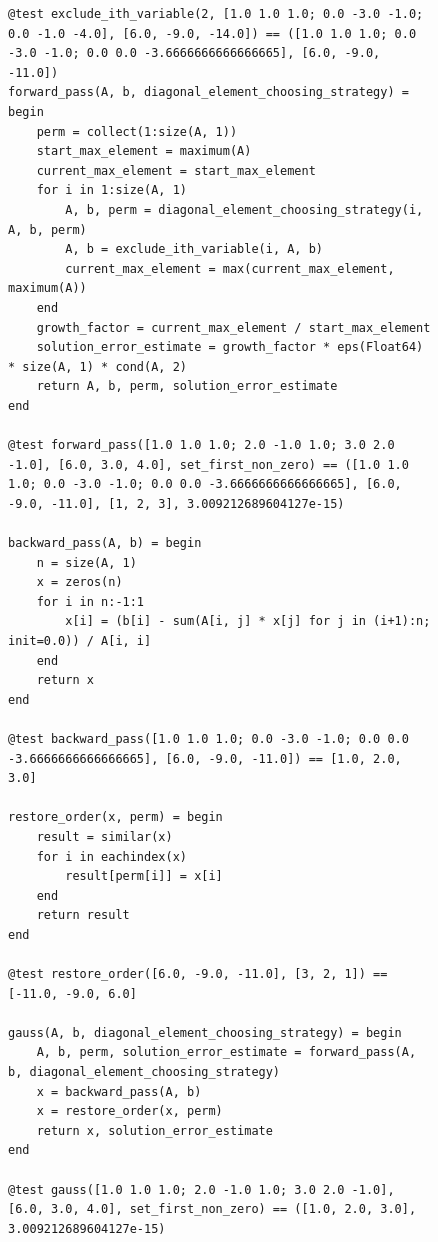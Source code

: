 \documentclass[a4paper, 14pt]{extarticle}
\begin{document}

\begin{figure}[!htb]
\begin{lstlisting}[language={},caption={Метод Гаусса (продолжение)},label={lst:code2}]
@test exclude_ith_variable(2, [1.0 1.0 1.0; 0.0 -3.0 -1.0; 0.0 -1.0 -4.0], [6.0, -9.0, -14.0]) == ([1.0 1.0 1.0; 0.0 -3.0 -1.0; 0.0 0.0 -3.6666666666666665], [6.0, -9.0, -11.0])
forward_pass(A, b, diagonal_element_choosing_strategy) = begin
    perm = collect(1:size(A, 1))
    start_max_element = maximum(A)
    current_max_element = start_max_element
    for i in 1:size(A, 1)
        A, b, perm = diagonal_element_choosing_strategy(i, A, b, perm)
        A, b = exclude_ith_variable(i, A, b)
        current_max_element = max(current_max_element, maximum(A))
    end
    growth_factor = current_max_element / start_max_element
    solution_error_estimate = growth_factor * eps(Float64) * size(A, 1) * cond(A, 2)
    return A, b, perm, solution_error_estimate
end

@test forward_pass([1.0 1.0 1.0; 2.0 -1.0 1.0; 3.0 2.0 -1.0], [6.0, 3.0, 4.0], set_first_non_zero) == ([1.0 1.0 1.0; 0.0 -3.0 -1.0; 0.0 0.0 -3.6666666666666665], [6.0, -9.0, -11.0], [1, 2, 3], 3.009212689604127e-15)

backward_pass(A, b) = begin
    n = size(A, 1)
    x = zeros(n)
    for i in n:-1:1
        x[i] = (b[i] - sum(A[i, j] * x[j] for j in (i+1):n; init=0.0)) / A[i, i]
    end
    return x
end

@test backward_pass([1.0 1.0 1.0; 0.0 -3.0 -1.0; 0.0 0.0 -3.6666666666666665], [6.0, -9.0, -11.0]) == [1.0, 2.0, 3.0]

restore_order(x, perm) = begin
    result = similar(x)
    for i in eachindex(x)
        result[perm[i]] = x[i]
    end
    return result
end

@test restore_order([6.0, -9.0, -11.0], [3, 2, 1]) == [-11.0, -9.0, 6.0]

gauss(A, b, diagonal_element_choosing_strategy) = begin
    A, b, perm, solution_error_estimate = forward_pass(A, b, diagonal_element_choosing_strategy)
    x = backward_pass(A, b)
    x = restore_order(x, perm)
    return x, solution_error_estimate
end

@test gauss([1.0 1.0 1.0; 2.0 -1.0 1.0; 3.0 2.0 -1.0], [6.0, 3.0, 4.0], set_first_non_zero) == ([1.0, 2.0, 3.0], 3.009212689604127e-15)

\end{lstlisting}
\end{figure}
\end{document}
